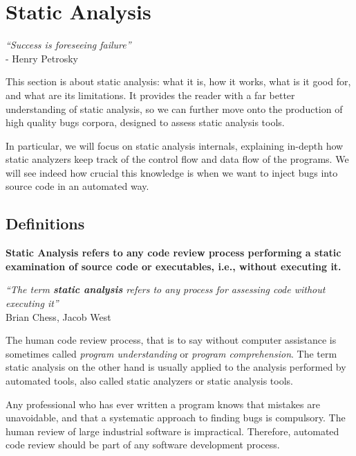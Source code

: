 \section{Static Analysis}
\label{sec:static-analysis}

\begin{center}
    \emph{``Success is foreseeing failure''\\}
    - Henry Petrosky
\end{center}

This section is about static analysis: what it is, how it works, what is it good for, and what are its limitations. It provides the reader with a far better understanding of static analysis, so we can further move onto the production of high quality bugs corpora, designed to assess static analysis tools.

In particular, we will focus on static analysis internals, explaining in-depth how static analyzers keep track of the control flow and data flow of the programs. We will see indeed how crucial this knowledge is when we want to inject bugs into source code in an automated way.

\subsection{Definitions}

\textbf{Static Analysis refers to any code review process performing a static examination of source code or executables, i.e., without executing it.} 

\begin{flushright}
    \emph{``The term \textbf{static analysis} refers to any process for assessing code without executing it''\\}
    \cite{chess2007secure} Brian Chess, Jacob West
\end{flushright}

The human code review process, that is to say without computer assistance is sometimes called \emph{program understanding} or \emph{program comprehension}. The term static analysis on the other hand is usually applied to the analysis performed by automated tools, also called static analyzers or static analysis tools.

Any professional who has ever written a program knows that mistakes are unavoidable, and that a systematic approach to finding bugs is compulsory. The human review of large industrial software is impractical. Therefore, automated code review should be part of any software development process.

